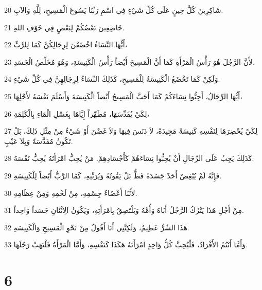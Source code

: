\par 20 شَاكِرِينَ كُلَّ حِينٍ عَلَى كُلِّ شَيْءٍ فِي اسْمِ رَبِّنَا يَسُوعَ الْمَسِيحِ، لِلَّهِ وَالآبِ.
\par 21 خَاضِعِينَ بَعْضُكُمْ لِبَعْضٍ فِي خَوْفِ اللهِ.
\par 22 أَيُّهَا النِّسَاءُ اخْضَعْنَ لِرِجَالِكُنَّ كَمَا لِلرَّبِّ،
\par 23 لأَنَّ الرَّجُلَ هُوَ رَأْسُ الْمَرْأَةِ كَمَا أَنَّ الْمَسِيحَ أَيْضاً رَأْسُ الْكَنِيسَةِ، وَهُوَ مُخَلِّصُ الْجَسَدِ.
\par 24 وَلَكِنْ كَمَا تَخْضَعُ الْكَنِيسَةُ لِلْمَسِيحِ، كَذَلِكَ النِّسَاءُ لِرِجَالِهِنَّ فِي كُلِّ شَيْءٍ.
\par 25 أَيُّهَا الرِّجَالُ، أَحِبُّوا نِسَاءَكُمْ كَمَا أَحَبَّ الْمَسِيحُ أَيْضاً الْكَنِيسَةَ وَأَسْلَمَ نَفْسَهُ لأَجْلِهَا،
\par 26 لِكَيْ يُقَدِّسَهَا، مُطَهِّراً إِيَّاهَا بِغَسْلِ الْمَاءِ بِالْكَلِمَةِ،
\par 27 لِكَيْ يُحْضِرَهَا لِنَفْسِهِ كَنِيسَةً مَجِيدَةً، لاَ دَنَسَ فِيهَا وَلاَ غَضْنَ أَوْ شَيْءٌ مِنْ مِثْلِ ذَلِكَ، بَلْ تَكُونُ مُقَدَّسَةً وَبِلاَ عَيْبٍ.
\par 28 كَذَلِكَ يَجِبُ عَلَى الرِّجَالِ أَنْ يُحِبُّوا نِسَاءَهُمْ كَأَجْسَادِهِمْ. مَنْ يُحِبُّ امْرَأَتَهُ يُحِبُّ نَفْسَهُ.
\par 29 فَإِنَّهُ لَمْ يُبْغِضْ أَحَدٌ جَسَدَهُ قَطُّ بَلْ يَقُوتُهُ وَيُرَبِّيهِ، كَمَا الرَّبُّ أَيْضاً لِلْكَنِيسَةِ.
\par 30 لأَنَّنَا أَعْضَاءُ جِسْمِهِ، مِنْ لَحْمِهِ وَمِنْ عِظَامِهِ.
\par 31 مِنْ أَجْلِ هَذَا يَتْرُكُ الرَّجُلُ أَبَاهُ وَأُمَّهُ وَيَلْتَصِقُ بِامْرَأَتِهِ، وَيَكُونُ الِاثْنَانِ جَسَداً وَاحِداً.
\par 32 هَذَا السِّرُّ عَظِيمٌ، وَلَكِنَّنِي أَنَا أَقُولُ مِنْ نَحْوِ الْمَسِيحِ وَالْكَنِيسَةِ.
\par 33 وَأَمَّا أَنْتُمُ الأَفْرَادُ، فَلْيُحِبَّ كُلُّ وَاحِدٍ امْرَأَتَهُ هَكَذَا كَنَفْسِهِ، وَأَمَّا الْمَرْأَةُ فَلْتَهَبْ رَجُلَهَا.

\chapter{6}

